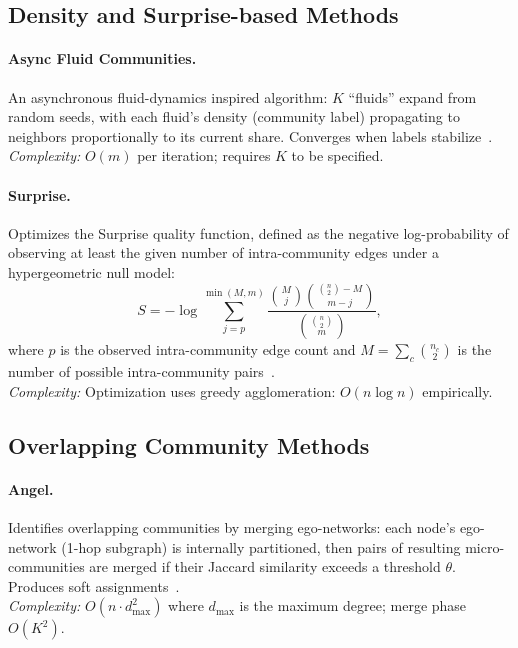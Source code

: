 \documentclass[11pt]{article}
\begin{document}
\subsection{Density and Surprise-based Methods}

\paragraph{Async Fluid Communities.}
An asynchronous fluid-dynamics inspired algorithm: $K$ ``fluids'' expand from random seeds, with each fluid's density (community label) propagating to neighbors proportionally to its current share. Converges when labels stabilize~\citep{santo_fortunato_93a74814}.\\
\emph{Complexity:} $O(m)$ per iteration; requires $K$ to be specified.

\paragraph{Surprise.}
Optimizes the Surprise quality function, defined as the negative log-probability of observing at least the given number of intra-community edges under a hypergeometric null model:
\[
S = -\log \sum_{j=p}^{\min(M,m)} \frac{\binom{M}{j}\binom{\binom{n}{2}-M}{m-j}}{\binom{\binom{n}{2}}{m}},
\]
where $p$ is the observed intra-community edge count and $M = \sum_c \binom{n_c}{2}$ is the number of possible intra-community pairs~\citep{santo_fortunato_93a74814}.\\
\emph{Complexity:} Optimization uses greedy agglomeration: $O(n\log n)$ empirically.

\subsection{Overlapping Community Methods}

\paragraph{Angel.}
Identifies overlapping communities by merging ego-networks: each node's ego-network (1-hop subgraph) is internally partitioned, then pairs of resulting micro-communities are merged if their Jaccard similarity exceeds a threshold $\theta$. Produces soft assignments~\citep{santo_fortunato_93a74814}.\\
\emph{Complexity:} $O(n \cdot d_{\max}^2)$ where $d_{\max}$ is the maximum degree; merge phase $O(K^2)$.
\end{document}
